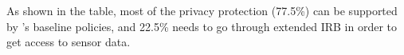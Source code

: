 As shown in the table, most of the privacy protection (77.5\%) can be supported by
\sysname's baseline policies, and 22.5\% needs to go through extended IRB in order
to get access to sensor data. 


\begin{comment}
As another example, prior work shows 
that Android users' touch inputs can be revealed through a few attack 
techniques like keyloggers and fingerprinting. 
User generated data thus can be informative enough 
for malware to infer the key the user enters~\cite{cai2011touchlogger, 
owusu2012accessory}, or to fingerprint and identify individual 
devices~\cite{bojinov2014mobile, dey2014accelprint}. Because these 
motion sensors are accessible 
without requesting any 
permissions or notifying the device owner, these attack techniques are much 
less detectable. However, the chance for these techniques to succeed
depends on their sampling rate. 
Therefore, the policies to restrict the access rates to motion sensors 
are effective when the allowed rate is lower than the best keylogger 
would require to identify a key, or the best tracker to fingerprint a device.
Section~\ref{sec-experiment} shows such an example. 
\end{comment}




